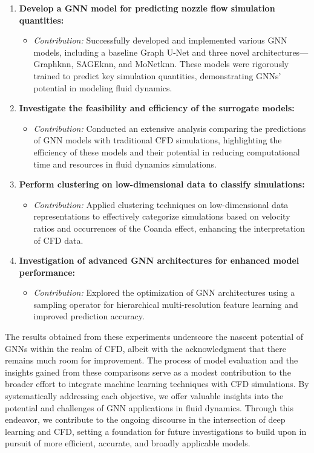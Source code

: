 \begin{enumerate}
    \item \textbf{Develop a GNN model for predicting nozzle flow simulation quantities:}
    \begin{itemize}
        \item \textit{Contribution:} Successfully developed and implemented various GNN models, including a baseline Graph U-Net and three novel architectures—Graphknn, SAGEknn, and MoNetknn. These models were rigorously trained to predict key simulation quantities, demonstrating GNNs' potential in modeling fluid dynamics.
    \end{itemize}
    
    \item \textbf{Investigate the feasibility and efficiency of the surrogate models:}
    \begin{itemize}
        \item \textit{Contribution:} Conducted an extensive analysis comparing the predictions of GNN models with traditional CFD simulations, highlighting the efficiency of these models and their potential in reducing computational time and resources in fluid dynamics simulations.
    \end{itemize}
    
    \item \textbf{Perform clustering on low-dimensional data to classify simulations:}
    \begin{itemize}
        \item \textit{Contribution:} Applied clustering techniques on low-dimensional data representations to effectively categorize simulations based on velocity ratios and occurrences of the Coanda effect, enhancing the interpretation of CFD data.
    \end{itemize}
    
    \item \textbf{Investigation of advanced GNN architectures for enhanced model performance:}
    \begin{itemize}
        \item \textit{Contribution:} Explored the optimization of GNN architectures using a sampling operator for hierarchical multi-resolution feature learning and improved prediction accuracy.
    \end{itemize}
\end{enumerate}
The results obtained from these experiments underscore the nascent potential of GNNs within the realm of CFD, albeit with the acknowledgment that there remains much room for improvement. The process of model evaluation and the insights gained from these comparisons serve as a modest contribution to the broader effort to integrate machine learning techniques with CFD simulations. By systematically addressing each objective, we offer valuable insights into the potential and challenges of GNN applications in fluid dynamics. Through this endeavor, we contribute to the ongoing discourse in the intersection of deep learning and CFD, setting a foundation for future investigations to build upon in pursuit of more efficient, accurate, and broadly applicable models.

